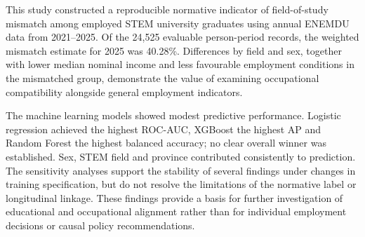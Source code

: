 This study constructed a reproducible normative indicator of field-of-study mismatch among employed STEM university graduates using annual ENEMDU data from 2021--2025. Of the 24,525 evaluable person-period records, the weighted mismatch estimate for 2025 was 40.28\%. Differences by field and sex, together with lower median nominal income and less favourable employment conditions in the mismatched group, demonstrate the value of examining occupational compatibility alongside general employment indicators.

The machine learning models showed modest predictive performance. Logistic regression achieved the highest ROC-AUC, XGBoost the highest AP and Random Forest the highest balanced accuracy; no clear overall winner was established. Sex, STEM field and province contributed consistently to prediction. The sensitivity analyses support the stability of several findings under changes in training specification, but do not resolve the limitations of the normative label or longitudinal linkage. These findings provide a basis for further investigation of educational and occupational alignment rather than for individual employment decisions or causal policy recommendations.
